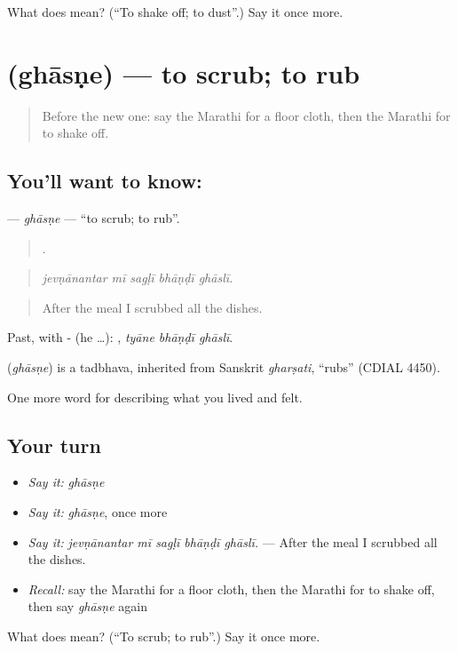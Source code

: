 \begin{tcolorbox}[breakable,colback=teal!4,colframe=teal!35!black,title={Before you move on}]
What does  mean? (\textquotedblleft{}To shake off; to dust\textquotedblright{}.) Say it once more.
\end{tcolorbox}
\section[\texorpdfstring{\mr{घासणे} (ghāsṇe)}{घासणे (ghāsṇe)}]{ (ghāsṇe) — to scrub; to rub}

\label{lesson:MR-C524-ghasne}



\begin{quote}
Before the new one: say the Marathi for a floor cloth, then the Marathi for to shake off.
\end{quote}

\subsection*{You'll want to know: }
\textbf{} — \emph{ghāsṇe} — \textquotedblleft{}to scrub; to rub\textquotedblright{}.

\begin{quote}
    .
\end{quote}

\begin{quote}
\emph{jevṇānantar mī sagḷī bhāṇḍī ghāslī.}
\end{quote}

\begin{quote}
After the meal I scrubbed all the dishes.
\end{quote}

Past, with - (he …):   , \emph{tyāne bhāṇḍī ghāslī}.

\begin{cousinweb}
\textbf{} (\emph{ghāsṇe}) is a tadbhava, inherited from Sanskrit \emph{gharṣati}, \textquotedblleft{}rubs\textquotedblright{} (CDIAL 4450).
\end{cousinweb}

\begin{grammarlens}[title={What you've built}]
One more word for describing what you lived and felt.
\end{grammarlens}

\subsection*{Your turn}
\begin{itemize}
\raggedright
  \item \emph{Say it:} \emph{ghāsṇe}
  \item \emph{Say it:} \emph{ghāsṇe}, once more
  \item \emph{Say it:} \emph{jevṇānantar mī sagḷī bhāṇḍī ghāslī.} — After the meal I scrubbed all the dishes.
  \item \emph{Recall:} say the Marathi for a floor cloth, then the Marathi for to shake off, then say \emph{ghāsṇe} again
\end{itemize}

\begin{tcolorbox}[breakable,colback=teal!4,colframe=teal!35!black,title={Before you move on}]
What does  mean? (\textquotedblleft{}To scrub; to rub\textquotedblright{}.) Say it once more.
\end{tcolorbox}
